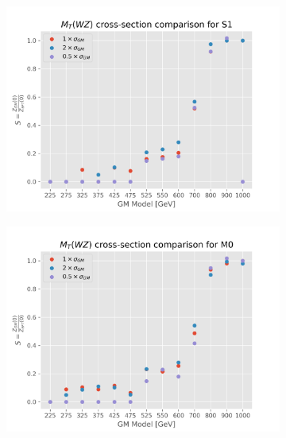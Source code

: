 \documentclass[../Bachelorarbeit.tex]{subfiles}
\begin{document}
\begin{figure}[h]
    \centering
    \begin{subfigure}{0.45\textwidth}
        \includegraphics[width=\textwidth]{Plots/gm_relevanze/MTWZ_comparision_S1.png}
        \caption{}
    \end{subfigure}
    \begin{subfigure}{0.45\textwidth}
        \includegraphics[width=\textwidth]{Plots/gm_relevanze/MTWZ_comparision_M0.png}
        \caption{}
    \end{subfigure}
    \begin{subfigure}{0.45\textwidth}

\end{subfigure}
\end{figure}
\end{document}
